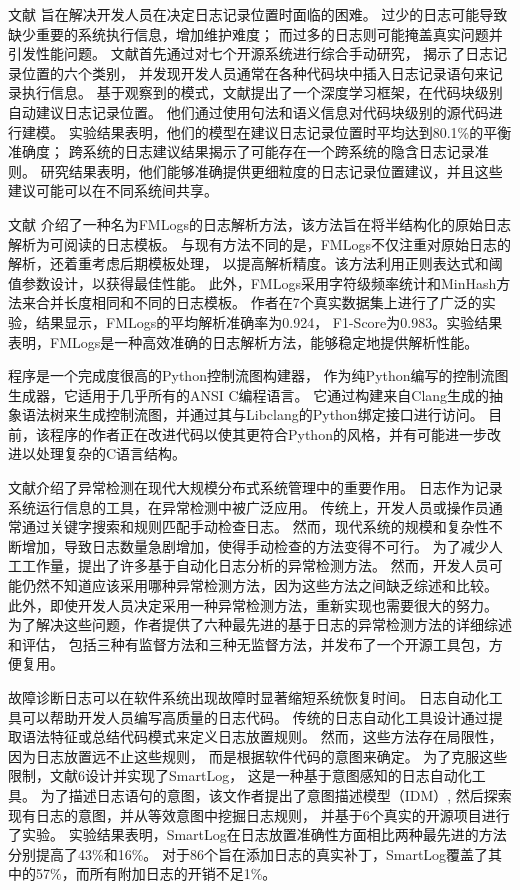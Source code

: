 文献\cite{li2020shall}
旨在解决开发人员在决定日志记录位置时面临的困难。
过少的日志可能导致缺少重要的系统执行信息，增加维护难度；
而过多的日志则可能掩盖真实问题并引发性能问题。
文献首先通过对七个开源系统进行综合手动研究，
揭示了日志记录位置的六个类别，
并发现开发人员通常在各种代码块中插入日志记录语句来记录执行信息。
基于观察到的模式，文献提出了一个深度学习框架，在代码块级别自动建议日志记录位置。
他们通过使用句法和语义信息对代码块级别的源代码进行建模。
实验结果表明，他们的模型在建议日志记录位置时平均达到80.1\%的平衡准确度；
跨系统的日志建议结果揭示了可能存在一个跨系统的隐含日志记录准则。
研究结果表明，他们能够准确提供更细粒度的日志记录位置建议，并且这些建议可能可以在不同系统间共享。


文献\cite{JSYJ2024031400B}
介绍了一种名为FMLogs的日志解析方法，该方法旨在将半结构化的原始日志解析为可阅读的日志模板。
与现有方法不同的是，FMLogs不仅注重对原始日志的解析，还着重考虑后期模板处理，
以提高解析精度。该方法利用正则表达式和阈值参数设计，以获得最佳性能。
此外，FMLogs采用字符级频率统计和MinHash方法来合并长度相同和不同的日志模板。
作者在7个真实数据集上进行了广泛的实验，结果显示，FMLogs的平均解析准确率为0.924，
F1-Score为0.983。实验结果表明，FMLogs是一种高效准确的日志解析方法，能够稳定地提供解析性能。



程序\cite{pyc-cfg}是一个完成度很高的Python控制流图构建器，
作为纯Python编写的控制流图生成器，它适用于几乎所有的ANSI C编程语言。
它通过构建来自Clang生成的抽象语法树来生成控制流图，并通过其与Libclang的Python绑定接口进行访问。
目前，该程序的作者正在改进代码以使其更符合Python的风格，并有可能进一步改进以处理复杂的C语言结构。

文献\cite{he2016experience}介绍了异常检测在现代大规模分布式系统管理中的重要作用。
日志作为记录系统运行信息的工具，在异常检测中被广泛应用。
传统上，开发人员或操作员通常通过关键字搜索和规则匹配手动检查日志。
然而，现代系统的规模和复杂性不断增加，导致日志数量急剧增加，使得手动检查的方法变得不可行。
为了减少人工工作量，提出了许多基于自动化日志分析的异常检测方法。
然而，开发人员可能仍然不知道应该采用哪种异常检测方法，因为这些方法之间缺乏综述和比较。
此外，即使开发人员决定采用一种异常检测方法，重新实现也需要很大的努力。
为了解决这些问题，作者提供了六种最先进的基于日志的异常检测方法的详细综述和评估，
包括三种有监督方法和三种无监督方法，并发布了一个开源工具包，方便复用。

故障诊断日志可以在软件系统出现故障时显著缩短系统恢复时间。
日志自动化工具可以帮助开发人员编写高质量的日志代码。
传统的日志自动化工具设计通过提取语法特征或总结代码模式来定义日志放置规则。
然而，这些方法存在局限性，因为日志放置远不止这些规则，
而是根据软件代码的意图来确定。
为了克服这些限制，文献6\cite{li2020swisslog}设计并实现了SmartLog，
这是一种基于意图感知的日志自动化工具。
为了描述日志语句的意图，该文作者提出了意图描述模型（IDM）,
然后探索现有日志的意图，并从等效意图中挖掘日志规则，
并基于6个真实的开源项目进行了实验。
实验结果表明，SmartLog在日志放置准确性方面相比两种最先进的方法分别提高了43\%和16\%。
对于86个旨在添加日志的真实补丁，SmartLog覆盖了其中的57\%，而所有附加日志的开销不足1\%。

